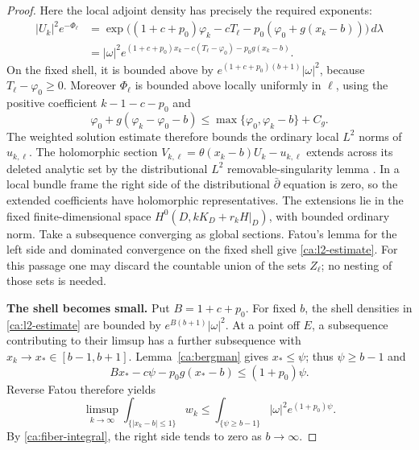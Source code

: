 \begin{proof}
Here the local adjoint density has precisely the required
exponents:
\begin{align*}
 |U_k|^2e^{-\Phi_\ell}
 &=\exp\bigl((1+c+p_0)\varphi_k-cT_\ell
                 -p_0(\varphi_0+g(x_k-b))\bigr)\,d\lambda\\
 &=|\omega|^2
       e^{(1+c+p_0)x_k-c(T_\ell-\varphi_0)-p_0g(x_k-b)}.
\end{align*}
On the fixed shell, it is bounded above by
\(e^{(1+c+p_0)(b+1)}|\omega|^2\), because
\(T_\ell-\varphi_0\geq0\).  Moreover \(\Phi_\ell\) is bounded
above locally uniformly in \(\ell\), using the positive coefficient
\(k-1-c-p_0\) and
\[
 \varphi_0+g(\varphi_k-\varphi_0-b)
       \leq\max\{\varphi_0,\varphi_k-b\}+C_g.
\]
The weighted solution estimate therefore bounds the ordinary local
\(L^2\) norms of \(u_{k,\ell}\).  The holomorphic section
\(V_{k,\ell}=\theta(x_k-b)U_k-u_{k,\ell}\) extends across its
deleted analytic set by the distributional \(L^2\) removable-singularity
lemma \cite[Lemma~12.10]{Demailly12}. In a local bundle frame the
right side of the distributional $\bar\partial$ equation is zero,
so the extended coefficients have holomorphic representatives.
The extensions lie in the fixed finite-dimensional space
\(H^0(D,kK_D+r_kH|_D)\), with bounded ordinary norm.  Take a
subsequence converging as global sections.  Fatou's lemma for the
left side and dominated convergence on the fixed shell give
\eqref{ca:l2-estimate}.  For this passage one may discard the
countable union of the sets \(Z_\ell\); no nesting of those sets is
needed.

\smallskip\noindent\textbf{The shell becomes small.}\enspace
Put \(B=1+c+p_0\).  For fixed \(b\), the shell densities in
\eqref{ca:l2-estimate} are bounded by
\(e^{B(b+1)}|\omega|^2\).  At a point off \(E\), a subsequence
contributing to their limsup has a further subsequence with
\(x_k\to x_*\in[b-1,b+1]\).  Lemma~\ref{ca:bergman} gives
\(x_*\leq\psi\); thus \(\psi\geq b-1\) and
\[
 Bx_*-c\psi-p_0g(x_*-b)\leq(1+p_0)\psi.
\]
Reverse Fatou therefore yields
\begin{equation}\label{ca:shell-tail}
 \limsup_{k\to\infty}\int_{\{|x_k-b|\leq1\}}w_k
 \leq\int_{\{\psi\geq b-1\}}|\omega|^2e^{(1+p_0)\psi}.
\end{equation}
By \eqref{ca:fiber-integral}, the right side tends to zero as
\(b\to\infty\).


\end{proof}
